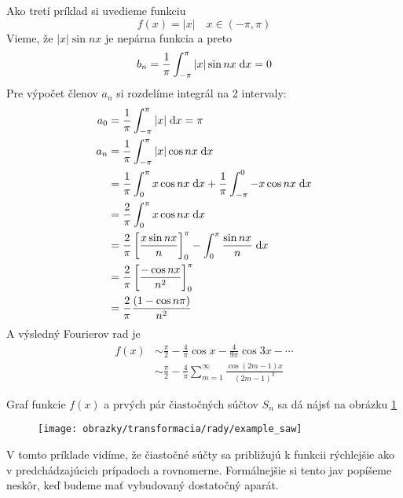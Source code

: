 
\begin{priklad}
    Ako tretí príklad si uvedieme funkciu
    \begin{equation}
        f(x) = |x| \quad x\in(-\pi,\pi)
    \end{equation}
    Vieme, že $|x| \sin nx$ je nepárna funkcia a preto
    \begin{equation}
        b_n = \frac{1}{\pi} \int_{-\pi}^{\pi} |x| \sin nx \; \mathrm{d} x = 0
    \end{equation}
    Pre výpočet členov $a_n$ si rozdelíme integrál na 2 intervaly:
    \begin{align}
        a_0 &= \frac{1}{\pi} \int_{-\pi}^{\pi} |x| \; \mathrm{d} x = \pi \\
        a_n &= \frac{1}{\pi} \int_{-\pi}^{\pi} |x| \cos nx \; \mathrm{d} x \\
            &= \frac{1}{\pi} \int_0^{\pi} x \cos nx \; \mathrm{d} x +
                \frac{1}{\pi} \int_{-\pi}^0 -x \cos nx \; \mathrm{d} x \\
            &= \frac{2}{\pi} \int_0^{\pi} x \cos nx \; \mathrm{d} x \\
            &= \frac{2}{\pi} \left[
                \frac{x \sin nx}{n}
                \right]_0^{\pi} -
                \int_0^{\pi} \frac{\sin nx}{n} \; \mathrm{d} x \\
            &= \frac{2}{\pi} \left[
                    \frac{-\cos nx}{n^2} \right]_0^\pi \\
            &= \frac{2}{\pi} \frac{(1-\cos n\pi)}{n^2}
    \end{align}
    A výsledný Fourierov rad je
    \begin{align}
        f(x) &\sim \frac{\pi}{2} - \frac{4}{\pi} \cos x -
            \frac{4}{9\pi} \cos 3x - \cdots \\
            &\sim \frac{\pi}{2} - \frac{4}{\pi}
                \sum_{m=1}^{\infty} \frac{\cos(2m-1) x}{(2m-1)^2}            
    \end{align}
    
    Graf funkcie $f(x)$ a prvých pár čiastočných súčtov $S_n$ sa dá
    nájsť na obrázku \ref{fig:example_saw}

    \begin{figure}[htp]
        \centering
        \texttt{[image: obrazky/transformacia/rady/example\_saw]}
        \caption{}
        \label{fig:example_saw}
    \end{figure}    
 V tomto príklade vidíme, že čiastočné súčty sa približujú k funkcii
 rýchlejšie ako v predchádzajúcich prípadoch a rovnomerne.
 Formálnejšie si tento jav popíšeme neskôr, keď budeme mať vybudovaný
 dostatočný aparát.
\end{priklad}

